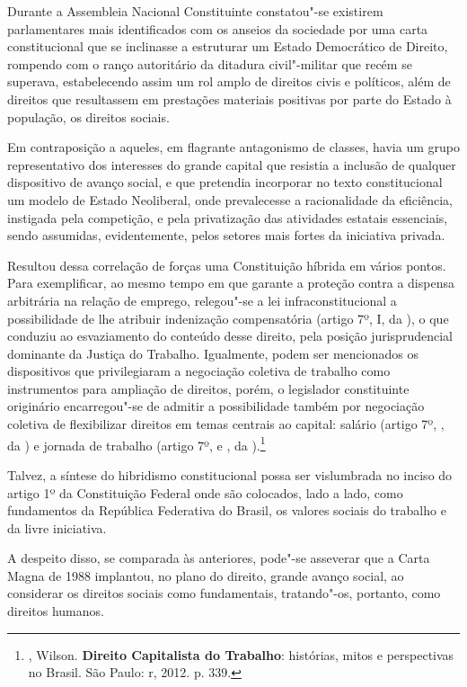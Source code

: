 Durante a Assembleia Nacional Constituinte constatou"-se existirem
parlamentares mais identificados com os anseios da sociedade por uma
carta constitucional que se inclinasse a estruturar um Estado
Democrático de Direito, rompendo com o ranço autoritário da ditadura
civil"-militar que recém se superava, estabelecendo assim um rol amplo de
direitos civis e políticos, além de direitos que resultassem em
prestações materiais positivas por parte do Estado à população, os
direitos sociais.

Em contraposição a aqueles, em flagrante antagonismo de classes, havia
um grupo representativo dos interesses do grande capital que resistia a
inclusão de qualquer dispositivo de avanço social, e que pretendia
incorporar no texto constitucional um modelo de Estado Neoliberal, onde
prevalecesse a racionalidade da eficiência, instigada pela competição, e
pela privatização das atividades estatais essenciais, sendo assumidas,
evidentemente, pelos setores mais fortes da iniciativa privada.

Resultou dessa correlação de forças uma Constituição híbrida em vários
pontos. Para exemplificar, ao mesmo tempo em que garante a proteção
contra a dispensa arbitrária na relação de emprego, relegou"-se a lei
infraconstitucional a possibilidade de lhe atribuir indenização
compensatória (artigo 7º, I, da ), o que conduziu ao esvaziamento do
conteúdo desse direito, pela posição jurisprudencial dominante da
Justiça do Trabalho. Igualmente, podem ser mencionados os dispositivos
que privilegiaram a negociação coletiva de trabalho como instrumentos
para ampliação de direitos, porém, o legislador constituinte originário
encarregou"-se de admitir a possibilidade também por negociação coletiva
de flexibilizar direitos em temas centrais ao capital: salário (artigo
7º, , da ) e jornada de trabalho (artigo 7º,  e , da
).\footnote{ , Wilson. \textbf{Direito Capitalista do
  Trabalho}: histórias, mitos e perspectivas no Brasil. São Paulo: r,
  2012. p. 339.}

Talvez, a síntese do hibridismo constitucional possa ser vislumbrada no
inciso  do artigo 1º da Constituição Federal onde são colocados, lado
a lado, como fundamentos da República Federativa do Brasil, os valores
sociais do trabalho e da livre iniciativa.

A despeito disso, se comparada às anteriores, pode"-se asseverar que a
Carta Magna de 1988 implantou, no plano do direito, grande avanço
social, ao considerar os direitos sociais como fundamentais,
tratando"-os, portanto, como direitos humanos.

